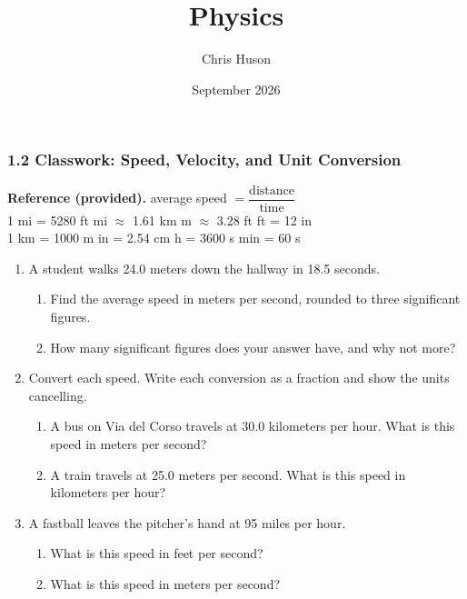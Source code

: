 \documentclass[12pt, twoside]{article}
\title{Physics}
\author{Chris Huson}
\date{September 2026}
\begin{document}
\subsubsection*{1.2 Classwork: Speed, Velocity, and Unit Conversion}

\textbf{Reference (provided).} \quad
average speed $= \dfrac{\text{distance}}{\text{time}}$ \\[0.15cm]
1 mi = 5280 ft  mi $\approx$ 1.61 km  m $\approx$ 3.28 ft  ft = 12 in \\
1 km = 1000 m  in = 2.54 cm  h = 3600 s  min = 60 s

\vspace{0.2cm}

\begin{enumerate}[itemsep=0.4cm]

\item A student walks 24.0 meters down the hallway in 18.5 seconds.
  \begin{enumerate}[itemsep=1.1cm]
    \item Find the average speed in meters per second, rounded to three significant figures.
    \item How many significant figures does your answer have, and why not more?
  \end{enumerate} \vspace{1.1cm}

\item Convert each speed. Write each conversion as a fraction and show the units cancelling.
  \begin{enumerate}[itemsep=2.4cm]
    \item A bus on Via del Corso travels at 30.0 kilometers per hour. What is this speed in meters per second?
    \item A train travels at 25.0 meters per second. What is this speed in kilometers per hour?
  \end{enumerate} \vspace{2.4cm}

\item A fastball leaves the pitcher's hand at 95 miles per hour.
  \begin{enumerate}[itemsep=2.4cm]
    \item What is this speed in feet per second?
    \item What is this speed in meters per second?
  \end{enumerate} \vspace{2.2cm}


\end{enumerate}
\end{document}
